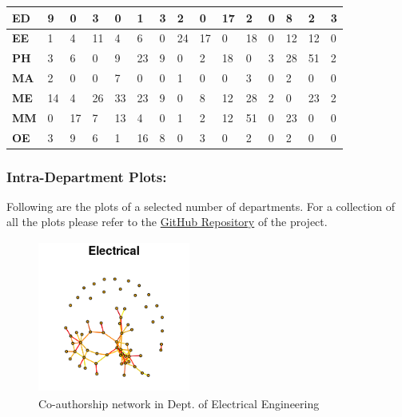 \documentclass[conference,compsoc]{IEEEtran}
\begin{document}
\begin{table}[h]
{\begin{tabular}{|l|l|l|l|l|l|l|l|l|l|l|l|l|l|l|}
\textbf{ED}  & 9           & 0           & 3           & 0           & 1           & 3           & 2            & 0           & 17          & 2           & 0           & 8           & 2           & 3           \\ \hline
\textbf{EE}  & 1           & 4           & 11          & 4           & 6           & 0           & 24           & 17          & 0           & 18          & 0           & 12          & 12          & 0           \\ \hline
\textbf{PH}  & 3           & 6           & 0           & 9           & 23          & 9           & 0            & 2           & 18          & 0           & 3           & 28          & 51          & 2           \\ \hline
\textbf{MA}  & 2           & 0           & 0           & 7           & 0           & 0           & 1            & 0           & 0           & 3           & 0           & 2           & 0           & 0           \\ \hline
\textbf{ME}  & 14          & 4           & 26          & 33          & 23          & 9           & 0            & 8           & 12          & 28          & 2           & 0           & 23          & 2           \\ \hline
\textbf{MM}  & 0           & 17          & 7           & 13          & 4           & 0           & 1            & 2           & 12          & 51          & 0           & 23          & 0           & 0           \\ \hline
\textbf{OE}  & 3           & 9           & 6           & 1           & 16          & 8           & 0            & 3           & 0           & 2           & 0           & 2           & 0           & 0           \\ \hline
\end{tabular}%
}
\end{table}

\newpage

\subsubsection*{Intra-Department Plots:}

Following are the plots of a selected number of departments. For a collection of all the plots please refer to the \href{https://github.com/ashutoshkrjha/EE5154_Repo}{GitHub Repository} of the project.

\begin{figure}[h]
    \centering
    \includegraphics[width=5cm,height=5cm]{ee}
    \caption{Co-authorship network in Dept. of Electrical Engineering}
    \label{fig:ee}
\end{figure}
\end{document}
